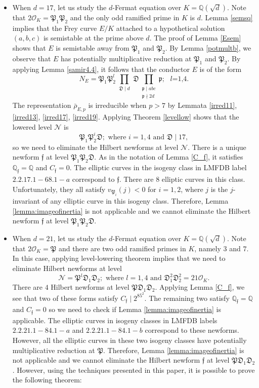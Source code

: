 \documentclass[]{article}
\newcommand {\QQ}{{\mathbb{Q}}}
\newcommand {\mcalO}{{\mathcal{O}}}
\newcommand {\mfp}{{\mathfrak{P}}}
\begin{document}
\begin{itemize}
    \item When $d=17$, let us study the $d$-Fermat equation over $K=\QQ(\sqrt{d})$. Note that $2\mcalO_K=\mfp_1\mfp_2$ and the only odd ramified prime in $K$ is $d$. Lemma \ref{semsq} implies that the Frey curve $E/K$ attached to a hypothetical solution $(a,b,c)$ is semistable at the prime above $d$. The proof of Lemma \ref{Esem} shows that $E$ is semistable away from $\mfp_1$ and $\mfp_2$. By Lemma \ref{potmultb}, we observe that $E$ has potentially multiplicative reduction at $\mfp_1$ and $\mfp_2$. By applying Lemma \ref{samir4.4}, it follows that the conductor $E$ is of the form $$N_E=\mfp_1\mfp_2^l\prod_{\substack{\mathfrak{D} \mid d }} \mathfrak{D} \prod_{\substack{\mathfrak{p} \mid a b c \\ \mathfrak{p} \nmid 2d}} \mathfrak{p};\text{ $l$=1,4.}$$The representation $\bar{\rho}_{E, p}$ is irreducible when $p>7$ by Lemmata \ref{irred11}, \ref{irred13}, \ref{irred17}, \ref{irred19}. Applying Theorem \ref{levellow} shows that the lowered level $\mathcal{N}$ is $$\mfp_1\mfp_2^i\mathfrak{D};\text{ where $i=1,4$ and $\mathfrak{D}\mid 17$},$$so we need to eliminate the Hilbert newforms at level $\mathcal{N}$. There is a unique newform $\mathfrak{f}$ at level $\mfp_1\mfp_2\mathfrak{D}$. As in the notation of Lemma \ref{C_f}, it satisfies $\QQ_\mathfrak{f}=\QQ$ and $C_\mathfrak{f}=0$. The elliptic curves in the isogeny class in LMFDB label $2.2.17.1-68.1-a$ correspond to $\mathfrak{f}$. There are $8$ elliptic curves in this class. Unfortunately, they all satisfy $v_{\mfp_i}(j)<0$ for $i=1,2$, where $j$ is the $j$-invariant of any elliptic curve in this isogeny class. Therefore, Lemma \ref{lemma:imageofinertia} is not applicable and we cannot eliminate the Hilbert newform $\mathfrak{f}$ at level $\mfp_1\mfp_2\mathfrak{D}$.
    \item When $d=21$, let us study the $d$-Fermat equation over $K=\QQ(\sqrt{d})$. Note that $2\mcalO_K=\mfp$ and there are two odd ramified primes in $K$, namely $3$ and $7$. In this case, applying level-lowering theorem implies that we need to eliminate Hilbert newforms at level $$\mathcal{N}=\mfp^l\mathfrak{D}_1\mathfrak{D}_2;\text{ where $l=1,4$ and $\mathfrak{D}_1^2\mathfrak{D}_2^2=21\mcalO_K$}.$$There are $4$ Hilbert newforms at level $\mfp\mathfrak{D}_1\mathfrak{D}_2$. Applying Lemma \ref{C_f}, we see that two of these forms satisfy $C_\mathfrak{f}\mid 2^85^2$. The remaining two satisfy $\QQ_\mathfrak{f}=\QQ$ and $C_\mathfrak{f}=0$ so we need to check if Lemma \ref{lemma:imageofinertia} is applicable. The elliptic curves in isogeny classes in LMFDB labels $2.2.21.1-84.1-a$ and $2.2.21.1-84.1-b$ correspond to these newforms. However, all the elliptic curves in these two isogeny classes have potentially multiplicative reduction at $\mfp$. Therefore, Lemma \ref{lemma:imageofinertia} is not applicable and we cannot eliminate the Hilbert newform $\mathfrak{f}$ at level $\mfp\mathfrak{D}_1\mathfrak{D}_2$. However, using the techniques presented in this paper, it is possible to prove the following theorem:

\end{itemize}
\end{document}
